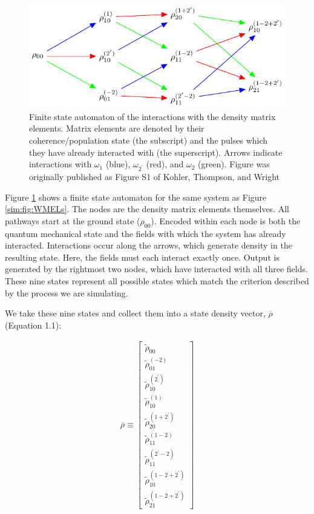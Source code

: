 \begin{figure}
\centering
\includegraphics{simulation/images/flow_diagram.pdf}
\caption{Finite state automaton of the interactions with the density
matrix elements. Matrix elements are denoted by their
coherence/population state (the subscript) and the pulses which they
have already interacted with (the superscript). Arrows indicate
interactions with \(\omega_1\) (blue), \(\omega_{2^\prime}\) (red), and
\(\omega_2\) (green). Figure was originally published as Figure S1 of
Kohler, Thompson, and Wright \cite{KohlerDanielDavid2017a} \label{sim:fig:fsa}}
\end{figure}

Figure \ref{sim:fig:fsa} shows a finite state automaton for the same
system as Figure \ref{sim:fig:WMELs}. The nodes are the density matrix
elements themselves. All pathways start at the ground state
(\(\rho_{00}\)). Encoded within each node is both the quantum mechanical
state and the fields with which the system has already interacted.
Interactions occur along the arrows, which generate density in the
resulting state. Here, the fields must each interact exactly once.
Output is generated by the rightmost two nodes, which have interacted
with all three fields. These nine states represent all possible states
which match the criterion described by the process we are simulating.

We take these nine states and collect them into a state density vector,
\(\overline{\rho}\) (Equation 1.1):

\[\begin{aligned}
\overline{\rho} \equiv
\begin{bmatrix}
\tilde{\rho}_{00} \\
\tilde{\rho}_{01}^{(-2)} \\
\tilde{\rho}_{10}^{(2^\prime)} \\
\tilde{\rho}_{10}^{(1)} \\
\tilde{\rho}_{20}^{(1+2^\prime)} \\
\tilde{\rho}_{11}^{(1-2)} \\
\tilde{\rho}_{11}^{(2^\prime-2)} \\
\tilde{\rho}_{10}^{(1-2+2^\prime)} \\
\tilde{\rho}_{21}^{(1-2+2^\prime)}
\end{bmatrix}
\end{aligned}\]

